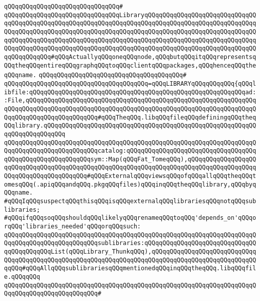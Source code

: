 \verb|qQQqqQQqqQQqqQQqqQQqqQQqqQQqqQQq#|\newline
\verb|qQQqqQQqqQQqqQQqqQQqqQQqqQQqqQQqLibraryqQQqqQQqqQQqqQQqqQQqqQQqqQQqqQQqqQQqqQQqqQQqqQQqqQQqqQQqqQQqqQQqqQQqqQQqqQQqqQQqqQQqqQQqqQQqqQQqqQQqqQQqqQQqqQQqqQQqqQQqqQQqqQQqqQQqqQQqqQQqqQQqqQQqqQQqqQQqqQQqqQQqqQQqqQQqqQQqqQQqqQQqqQQqqQQqqQQqqQQqqQQqqQQqqQQqqQQqqQQqqQQqqQQqqQQqqQQqqQQqqQQqqQQqqQQqqQQqqQQqqQQqqQQqqQQqqQQqqQQqqQQqqQQqqQQqqQQqqQQqqQQqqQQqqQQqqQQqqQQqqQQq#qQQqActuallyqQQqoneqQQqnode,qQQqbutqQQqitqQQqrepresentsqQQqtheqQQqentireqQQqgraphqQQqtoqQQqclientqQQqpackages,qQQqhenceqQQqtheqQQqname.|\newline
\verb|qQQqqQQqqQQqqQQqqQQqqQQqqQQqqQQqqQQqqQQq#|\newline
\verb|qQQqqQQqqQQqqQQqqQQqqQQqqQQqqQQqqQQqqQQq=qQQqLIBRARYqQQqqQQqqQQq{qQQqlibfile:qQQqqQQqqQQqqQQqqQQqqQQqqQQqqQQqqQQqqQQqqQQqqQQqqQQqqQQqqQQqad::File,qQQqqQQqqQQqqQQqqQQqqQQqqQQqqQQqqQQqqQQqqQQqqQQqqQQqqQQqqQQqqQQqqQQqqQQqqQQqqQQqqQQqqQQqqQQqqQQqqQQqqQQqqQQqqQQqqQQqqQQqqQQqqQQqqQQqqQQqqQQqqQQqqQQqqQQqqQQqqQQq#qQQqTheqQQq.libqQQqfileqQQqdefiningqQQqtheqQQqlibrary.qQQqqQQqqQQqqQQqqQQqqQQqqQQqqQQqqQQqqQQqqQQqqQQqqQQqqQQqqQQqqQQqqQQqqQQqqQQq|\newline
\verb|qQQqqQQqqQQqqQQqqQQqqQQqqQQqqQQqqQQqqQQqqQQqqQQqqQQqqQQqqQQqqQQqqQQqqQQqqQQqqQQqqQQqqQQqqQQqqQQqcatalog:qQQqqQQqqQQqqQQqqQQqqQQqqQQqqQQqqQQqqQQqqQQqqQQqqQQqqQQqqQQqsym::Map(qQQqFat_TomeqQQq),qQQqqQQqqQQqqQQqqQQqqQQqqQQqqQQqqQQqqQQqqQQqqQQqqQQqqQQqqQQqqQQqqQQqqQQqqQQqqQQqqQQqqQQqqQQqqQQqqQQqqQQqqQQqqQQq#qQQqExternalqQQqviewsqQQqofqQQqallqQQqtheqQQqtomesqQQq(.apiqQQqandqQQq.pkgqQQqfiles)qQQqinqQQqtheqQQqlibrary,qQQqbyqQQqname.|\newline
\newline
\verb|#qQQqIqQQqsuspectqQQqthisqQQqisqQQqexternalqQQqlibrariesqQQqnotqQQqsublibraries;|\newline
\verb|#qQQqifqQQqsoqQQqshouldqQQqlikelyqQQqrenameqQQqtoqQQq'depends_on'qQQqorqQQq'libraries_needed'qQQqorqQQqsuch:|\newline
\verb|qQQqqQQqqQQqqQQqqQQqqQQqqQQqqQQqqQQqqQQqqQQqqQQqqQQqqQQqqQQqqQQqqQQqqQQqqQQqqQQqqQQqqQQqqQQqqQQqsublibraries:qQQqqQQqqQQqqQQqqQQqqQQqqQQqqQQqqQQqqQQqqQQqList(qQQqLibrary_ThunkqQQq),qQQqqQQqqQQqqQQqqQQqqQQqqQQqqQQqqQQqqQQqqQQqqQQqqQQqqQQqqQQqqQQqqQQqqQQqqQQqqQQqqQQqqQQqqQQqqQQqqQQqqQQq#qQQqAllqQQqsublibrariesqQQqmentionedqQQqinqQQqtheqQQq.libqQQqfile.qQQqqQQq|\newline
\verb|qQQqqQQqqQQqqQQqqQQqqQQqqQQqqQQqqQQqqQQqqQQqqQQqqQQqqQQqqQQqqQQqqQQqqQQqqQQqqQQqqQQqqQQqqQQqqQQq#|\newline

